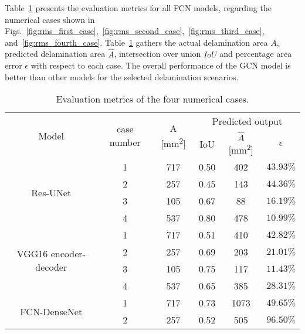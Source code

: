 Table~\ref{tab:RMS_num_cases} presents the evaluation metrics for all FCN models, regarding the numerical cases shown in Figs.~\ref{fig:rms_first_case},~\ref{fig:rms_second_case},~\ref{fig:rms_third_case}, and~\ref{fig:rms_fourth_case}.
Table~\ref{tab:RMS_num_cases} gathers the actual delamination area \(A\), predicted delamination area \(\hat{A}\), intersection over union \(IoU\) and percentage area error \(\epsilon\) with respect to each case. 
The overall performance of the GCN model is better than other models for the selected delamination scenarios.
\begin{table}[ht!]
	\centering
	\caption{Evaluation metrics of the four numerical cases.}
	\label{tab:RMS_num_cases}
	\begin{tabular}{cccccc}
		\toprule[1.5pt]
		\multirow{2}{*}{Model} & \multirow{2}{*}{case number} & \multicolumn{1}{c}{\multirow{2}{*}{A [mm\textsuperscript{2}]}} & \multicolumn{3}{c}{Predicted output} \\ 
		\cmidrule(lr){4-6} & & & \multicolumn{1}{c}{IoU} & \multicolumn{1}{c}{\(\hat{A}\) [mm\textsuperscript{2}]} & \(\epsilon\) \\
		\midrule
		\multirow{4}{*}{Res-UNet} 
		& 1 & 717 & \multicolumn{1}{c}{0.50} & \multicolumn{1}{c}{402} & \(43.93\%\) \\ 
		& 2 & 257 & \multicolumn{1}{c}{0.45} & \multicolumn{1}{c}{143} & \(44.36\%\) \\ 
		& 3 & 105 & \multicolumn{1}{c}{0.67} & \multicolumn{1}{c}{88} & \(16.19\%\) \\ 
		& 4 & 537 & \multicolumn{1}{c}{0.80} & \multicolumn{1}{c}{478} & \(10.99\%\) \\ 
		\midrule
		\multirow{4}{*}{VGG16 encoder-decoder} 
		& 1 & 717 & \multicolumn{1}{c}{0.51} & \multicolumn{1}{c}{410} & \(42.82\%\) \\ 
		& 2 & 257 & \multicolumn{1}{c}{0.69} & \multicolumn{1}{c}{203} & \(21.01\%\) \\ 
		& 3 & 105 & \multicolumn{1}{c}{0.75} & \multicolumn{1}{c}{117} & \(11.43\%\) \\ 
		& 4 & 537 & \multicolumn{1}{c}{0.65} & \multicolumn{1}{c}{385} & \(28.31\%\) \\ 
		\midrule
		\multirow{4}{*}{FCN-DenseNet} 
		& 1 & 717 & \multicolumn{1}{c}{0.73} & \multicolumn{1}{c}{1073} & \(49.65\%\) \\ 
		& 2 & 257 & \multicolumn{1}{c}{0.52} & \multicolumn{1}{c}{505} & \(96.50\%\) \\ 

\end{tabular}
\end{table}
